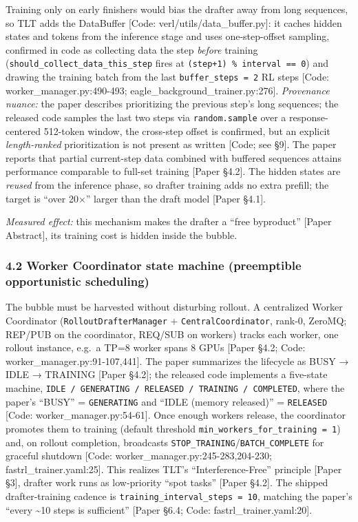 \documentclass[
  11pt,
  letterpaper,
]{article}
\begin{document}
Training only on early finishers would bias the drafter away from long
sequences, so TLT adds the DataBuffer {[}Code:
verl/utils/data\_buffer.py{]}: it caches hidden states and tokens from
the inference stage and uses one-step-offset sampling, confirmed in code
as collecting data the step \emph{before} training
(\texttt{should\_collect\_data\_this\_step} fires at
\texttt{(step+1)\ \%\ interval\ ==\ 0}) and drawing the training batch
from the last \texttt{buffer\_steps\ =\ 2} RL steps {[}Code:
worker\_manager.py:490-493; eagle\_background\_trainer.py:276{]}.
\emph{Provenance nuance:} the paper describes prioritizing the previous
step's long sequences; the released code samples the last two steps via
\texttt{random.sample} over a response-centered 512-token window, the
cross-step offset is confirmed, but an explicit \emph{length-ranked}
prioritization is not present as written {[}Code; see §9{]}. The paper
reports that partial current-step data combined with buffered sequences
attains performance comparable to full-set training {[}Paper §4.2{]}.
The hidden states are \emph{reused} from the inference phase, so drafter
training adds no extra prefill; the target is ``over 20×'' larger than
the draft model {[}Paper §4.1{]}.

\emph{Measured effect:} this mechanism makes the drafter a ``free
byproduct'' {[}Paper Abstract{]}, its training cost is hidden inside the
bubble.

\subsubsection{4.2 Worker Coordinator state machine (preemptible
opportunistic
scheduling)}\label{worker-coordinator-state-machine-preemptible-opportunistic-scheduling}

The bubble must be harvested without disturbing rollout. A centralized
Worker Coordinator (\texttt{RolloutDrafterManager} +
\texttt{CentralCoordinator}, rank-0, ZeroMQ; REP/PUB on the coordinator,
REQ/SUB on workers) tracks each worker, one rollout instance, e.g.~a
TP=8 worker spans 8 GPUs {[}Paper §4.2; Code:
worker\_manager.py:91-107,441{]}. The paper summarizes the lifecycle as
BUSY → IDLE → TRAINING {[}Paper §4.2{]}; the released code implements a
five-state machine,
\texttt{IDLE\ /\ GENERATING\ /\ RELEASED\ /\ TRAINING\ /\ COMPLETED},
where the paper's ``BUSY'' = \texttt{GENERATING} and ``IDLE (memory
released)'' = \texttt{RELEASED} {[}Code: worker\_manager.py:54-61{]}.
Once enough workers release, the coordinator promotes them to training
(default threshold \texttt{min\_workers\_for\_training\ =\ 1}) and, on
rollout completion, broadcasts
\texttt{STOP\_TRAINING}/\texttt{BATCH\_COMPLETE} for graceful shutdown
{[}Code: worker\_manager.py:245-283,204-230; fastrl\_trainer.yaml:25{]}.
This realizes TLT's ``Interference-Free'' principle {[}Paper §3{]},
drafter work runs as low-priority ``spot tasks'' {[}Paper §4.2{]}. The
shipped drafter-training cadence is
\texttt{training\_interval\_steps\ =\ 10}, matching the paper's ``every
\textasciitilde10 steps is sufficient'' {[}Paper §6.4; Code:
fastrl\_trainer.yaml:20{]}.
\end{document}
